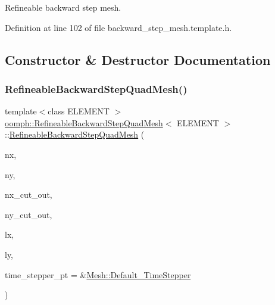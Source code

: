 Refineable backward step mesh. 

Definition at line 102 of file backward\+\_\+step\+\_\+mesh.\+template.\+h.



\subsection{Constructor \& Destructor Documentation}
\mbox{\label{classoomph_1_1RefineableBackwardStepQuadMesh_a0502cd96a9edc2789f9ddf6ec7b1d2ca}} 
\subsubsection{\texorpdfstring{Refineable\+Backward\+Step\+Quad\+Mesh()}{RefineableBackwardStepQuadMesh()}}
{\footnotesize\ttfamily template$<$class E\+L\+E\+M\+E\+NT $>$ \\
\hyperlink{classoomph_1_1RefineableBackwardStepQuadMesh}{oomph\+::\+Refineable\+Backward\+Step\+Quad\+Mesh}$<$ E\+L\+E\+M\+E\+NT $>$\+::\hyperlink{classoomph_1_1RefineableBackwardStepQuadMesh}{Refineable\+Backward\+Step\+Quad\+Mesh} (\begin{DoxyParamCaption}\item[{const unsigned \&}]{nx,  }\item[{const unsigned \&}]{ny,  }\item[{const unsigned \&}]{nx\+\_\+cut\+\_\+out,  }\item[{const unsigned \&}]{ny\+\_\+cut\+\_\+out,  }\item[{const double \&}]{lx,  }\item[{const double \&}]{ly,  }\item[{\hyperlink{classoomph_1_1TimeStepper}{Time\+Stepper} $\ast$}]{time\+\_\+stepper\+\_\+pt = {\ttfamily \&\hyperlink{classoomph_1_1Mesh_a12243d0fee2b1fcee729ee5a4777ea10}{Mesh\+::\+Default\+\_\+\+Time\+Stepper}} }\end{DoxyParamCaption})\hspace{0.3cm}{\ttfamily [inline]}}



